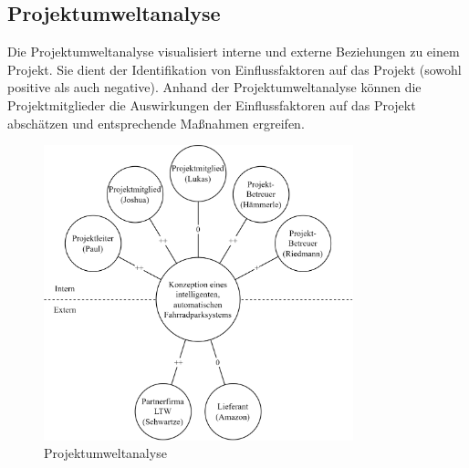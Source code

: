 \subsection{Projektumweltanalyse}

Die Projektumweltanalyse visualisiert interne und externe Beziehungen zu einem Projekt. Sie dient der Identifikation von Einflussfaktoren auf das Projekt (sowohl positive als auch negative). Anhand der Projektumweltanalyse können die Projektmitglieder die Auswirkungen der Einflussfaktoren auf das Projekt abschätzen und entsprechende Maßnahmen ergreifen. 

\begin{figure}[H]
    \centering
    \includegraphics[width=0.8\textwidth]{images/projektumweltanalyse.png}
    \caption{Projektumweltanalyse}
    \label{fig:projektumweltanalyse}
\end{figure}

